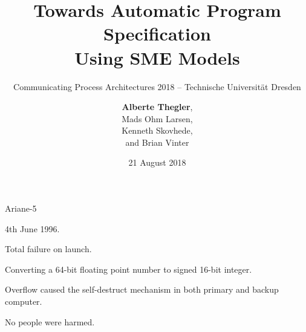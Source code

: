 \documentclass[13pt]{beamer}
\title[Towards Automatic Program Specification Using SME Models]{Towards Automatic Program Specification \\ Using SME Models}
\subtitle{\tiny Communicating Process Architectures 2018 -- Technische Universität Dresden}
\author[A. Thegler]
{\textbf{Alberte Thegler},\\
Mads Ohm Larsen,\\
Kenneth Skovhede,\\
and Brian Vinter\\
}
\institute[Niels Bohr Institute]{Niels Bohr Institute, University of Copenhagen, Denmark}
\date[August 21]{21 August 2018}
\newcommand{\cspm}{CSP$_M$}
\begin{document}
\frame[plain]{\titlepage}


%

\begin{frame}{Ariane-5}
  \begin{block}{}
    4th June 1996.
  \end{block}

  \pause

  \begin{block}{}
     Total failure on launch.
  \end{block}

  \pause

  \begin{block}{}
     Converting a 64-bit floating point number to signed 16-bit integer.
  \end{block}

  \pause

  \begin{block}{}
    Overflow caused the self-destruct mechanism in both primary and backup computer.
  \end{block}

  \pause

  \begin{block}{}
     No people were harmed.
  \end{block}

\end{frame}
\end{document}
